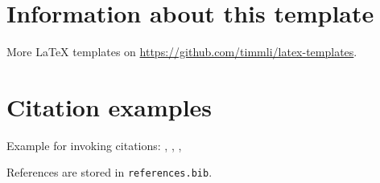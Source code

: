 \chapter{Information about this template}

More \LaTeX{} templates on \url{https://github.com/timmli/latex-templates}.

\chapter{Citation examples}

Example for invoking citations: \cite{Bech:63}, \citet[291]{Bech:63}, \citep{Bech:63}, \citealt{Bech:63}

References are stored in \texttt{references.bib}.
